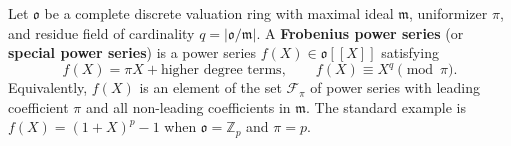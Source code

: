 Let $\mathfrak{o}$ be a complete discrete valuation ring with maximal ideal $\mathfrak{m}$, uniformizer $\pi$, and residue field of cardinality $q = |\mathfrak{o}/\mathfrak{m}|$. A \textbf{Frobenius power series} (or \textbf{special power series}) is a power series $f(X) \in \mathfrak{o}[[X]]$ satisfying
$$
f(X) = \pi X + \text{higher degree terms}, \qquad f(X) \equiv X^q \pmod{\pi}.
$$
Equivalently, $f(X)$ is an element of the set $\mathcal{F}_\pi$ of power series with leading coefficient $\pi$ and all non-leading coefficients in $\mathfrak{m}$. The standard example is $f(X) = (1+X)^p - 1$ when $\mathfrak{o} = \mathbb{Z}_p$ and $\pi = p$.
